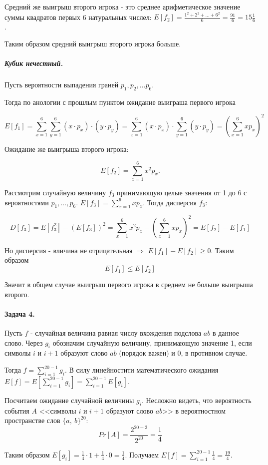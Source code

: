 \documentclass{article}
\begin{document}
    Средний же выигрыш второго игрока - это среднее арифметическое значение суммы квадратов первых 6 натуральных числел: $E[f_2] = \frac{1^2 + 2^2 + \ldots + 6^2}{6} = \frac{91}{6} = 15\frac{1}{6}$.

    Таким образом средний выигрыш второго игрока больше.

    \subparagraph{Кубик нечестный.}
    Пусть вероятности выпадения граней $p_1, p_2, \ldots p_6$.

    Тогда по анологии с прошлым пунктом ожидание выиграша первого игрока 

    $$E[f_1] = \sum_{x=1}^{6}\sum_{y=1}^{6} (x \cdot p_x) \cdot (y \cdot p_y) = 
    \sum_{x=1}^{6} (x \cdot p_x) \cdot \sum_{y=1}^{6} (y \cdot p_y) = (\sum_{x=1}^{6} xp_x)^2$$

    Ожидание же выигрыша второго игрока:

    $$E[f_2] = \sum_{x=1}^{6} x^2p_x.$$

    Рассмотрим случайную величину $f_3$ принимающую целые значения от 1 до 6 с вероятностями $p_1, \ldots, p_6$. $E[f_3] = \sum_{x=1}^{6} xp_x$. Тогда дисперсия $f_3$: 

    $$D[f_3] = E[f_3^2] - (E[f_3])^2 = \sum_{x=1}^{6} x^2p_x - (\sum_{x=1}^{6} xp_x)^2 = E[f_2] - E[f_1]$$

    Но дисперсия - вличина не отрицательная $\Rightarrow$ $E[f_1] - E[f_2] \ge 0$. Таким образом 
     $$E[f_1] \le E[f_2]$$

    Значит в общем случае выигрыш первого игрока в среднем не больше выигрыша второго.


    \paragraph{Задача 4.}
    Пусть $f$ - случайная величина равная числу вхождения подслова $ab$ в данное слово. Через $g_i$ обозначим случайную величину, принимающую значение 1, если символы $i$ и $i + 1$ образуют слово $ab$ (порядок важен) и 0, в противном случае.

    Тогда $f = \sum_{i=1}^{20 - 1} g_i$. В силу линейностити математического ожидания $E[f] = E[\sum_{i=1}^{20 - 1} g_i] = \sum_{i=1}^{20 - 1} E[g_i]$. 

    Посчитаем ожидание случайной величины $g_i$. Несложно видеть, что вероятность события $A$ <<символы $i$ и $i + 1$ образуют слово $ab$>> в вероятностном пространстве слов $\{a,\ b\}^20$:
    $$Pr[A] = \frac{2^{20 - 2}}{2^{20}} = \frac{1}{4}$$

    Таким образом $E[g_i] = \frac{1}{4} \cdot 1 + \frac{1}{4} \cdot 0 = \frac{1}{4}$.
    Получаем $E[f] = \sum_{i=1}^{20 - 1} \frac{1}{4} = \frac{19}{4}$.
\end{document}

